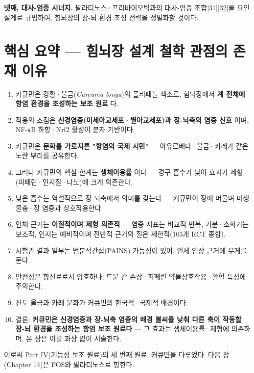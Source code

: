 \documentclass[11pt,oneside]{book}
\begin{document}
\textbf{넷째, 대사-염증 시너지.} 팔라티노스·프리바이오틱과의 대사-염증 조합[31][32]을 요인설계로 규명하여, 힘뇌장의 장-뇌 환경 조성 전략을 정밀화할 것이다.

\section{핵심 요약 — 힘뇌장 설계 철학 관점의 존재 이유}
\begin{enumerate}[leftmargin=6mm,itemsep=1pt,topsep=2pt]
  \item 커큐민은 강황·울금(\textit{Curcuma longa})의 폴리페놀 색소로, 힘뇌장에서 \textbf{계 전체에 항염 환경을 조성하는 보조 원료} 다.
  \item 작용의 초점은 \textbf{신경염증(미세아교세포·별아교세포)과 장-뇌축의 염증 신호} 이며, NF-κB 하향·Nrf2 활성이 분자 기반이다.
  \item 커큐민은 \textbf{문화를 가로지른 "항염의 국제 시민"} — 아유르베다·울금·카레가 같은 노란 뿌리를 공유한다.
  \item 그러나 커큐민의 핵심 한계는 \textbf{생체이용률} 이다 — 경구 흡수가 낮아 효과가 제형(피페린·인지질·나노)에 크게 의존한다.
  \item 낮은 흡수는 역설적으로 장-뇌축에서 의미를 갖는다 — 커큐민이 장에 머물며 미생물총·장 염증과 상호작용한다.
  \item 인체 근거는 \textbf{이질적이며 제형 의존적} — 염증 지표는 비교적 반복, 기분·소화기는 보조적, 인지는 예비적이며 전반적 근거의 질은 제한적(103개 RCT 종합).
  \item 시험관 결과 일부는 범분석간섭(PAINS) 가능성이 있어, 인체 임상 근거에 무게를 둔다.
  \item 안전성은 향신료로서 양호하나, 드문 간 손상·피페린 약물상호작용·활혈 특성에 주의한다.
  \item 진도 울금과 카레 문화가 커큐민의 한국적·국제적 배경이다.
  \item 결론: \textbf{커큐민은 신경염증과 장-뇌축 염증의 배경 불씨를 낮춰 다른 축이 작동할 장-뇌 환경을 조성하는 항염 보조 원료다} — 그 효과는 생체이용률·제형에 의존하며, 본 장은 이를 과장 없이 서술한다.
\end{enumerate}
이로써 Part IV(기능성 보조 원료)의 세 번째 원료, 커큐민을 다루었다. 다음 장(Chapter 14)은 FOS와 팔라티노스로 향한다.
\end{document}
